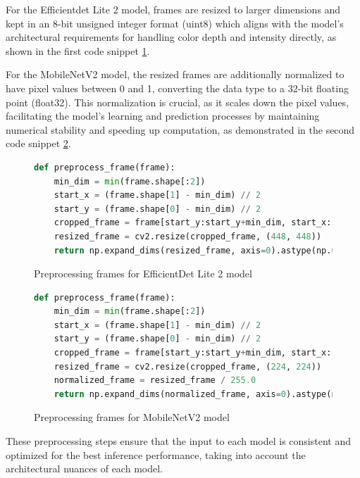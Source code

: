 For the Efficientdet Lite 2 model, frames are resized to larger dimensions and kept in an 8-bit unsigned integer format (uint8) which aligns with the model's architectural requirements for handling color depth and intensity directly, as shown in the first code snippet \ref{code:EfficientDet Lite 2_preprocess}.

For the MobileNetV2 model, the resized frames are additionally normalized to have pixel values between 0 and 1, converting the data type to a 32-bit floating point (float32). This normalization is crucial, as it scales down the pixel values, facilitating the model's learning and prediction processes by maintaining numerical stability and speeding up computation, as demonstrated in the second code snippet \ref{code:mobilenetv2_preprocess}.

\begin{figure}[H]
\begin{lstlisting}[language=Python]
def preprocess_frame(frame):
    min_dim = min(frame.shape[:2])
    start_x = (frame.shape[1] - min_dim) // 2
    start_y = (frame.shape[0] - min_dim) // 2
    cropped_frame = frame[start_y:start_y+min_dim, start_x:start_x+min_dim]
    resized_frame = cv2.resize(cropped_frame, (448, 448))
    return np.expand_dims(resized_frame, axis=0).astype(np.uint8), resized_frame
\end{lstlisting}
\caption{Preprocessing frames for EfficientDet Lite 2 model}
\label{code:EfficientDet Lite 2_preprocess}
\end{figure}

\begin{figure}[H]
\begin{lstlisting}[language=Python]
def preprocess_frame(frame):
    min_dim = min(frame.shape[:2])
    start_x = (frame.shape[1] - min_dim) // 2
    start_y = (frame.shape[0] - min_dim) // 2
    cropped_frame = frame[start_y:start_y+min_dim, start_x:start_x+min_dim]
    resized_frame = cv2.resize(cropped_frame, (224, 224))
    normalized_frame = resized_frame / 255.0
    return np.expand_dims(normalized_frame, axis=0).astype(np.float32), resized_frame
\end{lstlisting}
\caption{Preprocessing frames for MobileNetV2 model}
\label{code:mobilenetv2_preprocess}
\end{figure}

These preprocessing steps ensure that the input to each model is consistent and optimized for the best inference performance, taking into account the architectural nuances of each model.


